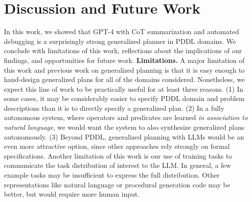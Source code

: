 \documentclass[letterpaper]{article} %
\begin{document}
\vspace{-3.02mm}
\section{Discussion and Future Work}

In this work, we showed that GPT-4 with CoT summarization and automated debugging is a surprisingly strong generalized planner in PDDL domains.
We conclude with limitations of this work, reflections about the implications of our findings, and opportunities for future work.  \textbf{Limitations.}
A major limitation of this work and previous work on generalized planning is that it is easy enough to hand-design generalized plans for all of the domains considered.
Nonetheless, we expect this line of work to be practically useful for at least three reasons.
(1) In some cases, it may be considerably easier to specify PDDL domain and problem descriptions than it is to directly specify a generalized plan.
(2) In a fully autonomous system, where operators and predicates are learned \emph{in association to natural language}, we would want the system to also synthesize generalized plans autonomously.
(3) Beyond PDDL, generalized planning with LLMs would be an even more attractive option, since other approaches rely strongly on formal specifications.
Another limitation of this work is our use of training tasks to communicate the task distribution of interest to the LLM.
In general, a few example tasks may be insufficient to express the full distribution.
Other representations like natural language or procedural generation code may be better, but would require more human input.
\end{document}
